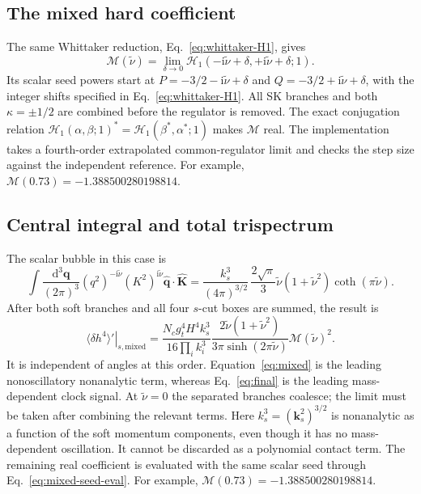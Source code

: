 \documentclass[a4paper,12pt]{article}
\newcommand{\ii}{\mathrm i}
\newcommand{\mb}{\mathbf}
\newcommand{\tn}{\tilde\nu}
\newcommand{\di}{\mathrm d}
\newcommand{\bq}{\mb q}
\newcommand{\bk}{\mb k}
\begin{document}
\subsection{The mixed hard coefficient}
The same Whittaker reduction, Eq.~\eqref{eq:whittaker-H1}, gives
\begin{equation}
 \mathcal M(\tn)=\lim_{\delta\to0}
 \mathcal H_1(-\ii\tn+\delta,+\ii\tn+\delta;1).
 \label{eq:mixed-seed-eval}
\end{equation}
Its scalar seed powers start at
$P=-3/2-\ii\tn+\delta$ and $Q=-3/2+\ii\tn+\delta$,
with the integer shifts specified in Eq.~\eqref{eq:whittaker-H1}.
All SK branches and both $\kappa=\pm1/2$ are combined before
the regulator is removed. The exact conjugation relation
$\mathcal H_1(\alpha,\beta;1)^*
=\mathcal H_1(\beta^*,\alpha^*;1)$ makes $\mathcal M$ real.
The implementation takes a fourth-order extrapolated common-regulator
limit and checks the step size against the independent reference.
For example, $\mathcal M(0.73)=-1.388500280198814$.

\subsection{Central integral and total trispectrum}
The scalar bubble in this case is
\begin{equation}
 \int\frac{\di^3\bq}{(2\pi)^3}(q^2)^{-\ii\tn}(K^2)^{\ii\tn}
 \widehat{\bq}\cdot\widehat{\mb K}
 =\frac{k_s^3}{(4\pi)^{3/2}}\,
 \frac{2\sqrt\pi}{3}\tn(1+\tn^2)\coth(\pi\tn).
\end{equation}
After both soft branches and all four $s$-cut boxes are summed, the result is
\begin{equation}
 \left.\langle\delta h^4\rangle'\right|_{s,\mathrm{mixed}}
 =\frac{N_cg_t^4H^4 k_s^3}{16\prod_i k_i^3}
 \frac{2\tn(1+\tn^2)}{3\pi\sinh(2\pi\tn)}
 \mathcal M(\tn)^2.
 \label{eq:mixed}
\end{equation}
It is independent of angles at this order. Equation~\eqref{eq:mixed} is the
leading nonoscillatory nonanalytic term, whereas Eq.~\eqref{eq:final} is the
leading mass-dependent clock signal. At $\tn=0$ the separated branches coalesce;
the limit must be taken after combining the relevant terms.
Here $k_s^3=(\bk_s^2)^{3/2}$ is nonanalytic as a function of the
soft momentum components, even though it has no mass-dependent oscillation.
It cannot be discarded as a polynomial contact term.
The remaining real coefficient is evaluated with the same scalar seed
through Eq.~\eqref{eq:mixed-seed-eval}.
For example, $\mathcal M(0.73)=-1.388500280198814$.
\end{document}
